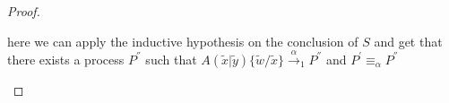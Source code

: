\begin{theorem}
\begin{proof}
\begin{description}
\begin{description}
\[{ 		  }
 		\]
	    here we can apply the inductive hypothesis on the conclusion of $S$ and get that there exists a process $P^{''}$ such that $A(\tilde{x}|\tilde{y})\{\tilde{w}/\tilde{x}\}\xrightarrow{\alpha}_{1}P^{''}$ and $P^{'}\equiv_{\alpha}P^{''}$
	\end{description}
    \end{description}
  \end{proof}
\end{theorem}



